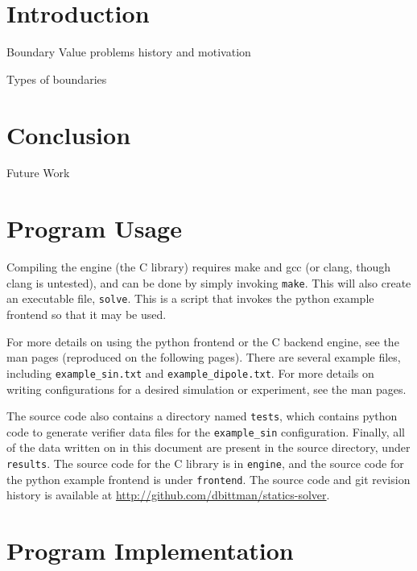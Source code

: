 \documentclass[12pt]{article}
\begin{document}
\section{Introduction}

Boundary Value problems history and motivation

Types of boundaries





\section{Conclusion}

Future Work



\clearpage
\begin{appendices}
\section{Program Usage}

Compiling the engine (the C library) requires make and gcc (or clang, though clang is untested), and can
be done by simply invoking \texttt{make}. This will also create an executable file, \texttt{solve}. This
is a script that invokes the python example frontend so that it may be used.

For more details on using the python frontend or the C backend engine, see the man pages (reproduced on the
following pages). There are several example files, including \texttt{example\_sin.txt} and \texttt{example\_dipole.txt}.
For more details on writing configurations for a desired simulation or experiment, see the man pages.

The source code also contains a directory named \texttt{tests}, which contains python code to generate verifier data
files for the \texttt{example\_sin} configuration. Finally, all of the data written on in this document are present
in the source directory, under \texttt{results}. The source code for the C library is in \texttt{engine}, and the
source code for the python example frontend is under \texttt{frontend}. The source code and git revision history
is available at \url{http://github.com/dbittman/statics-solver}.



\clearpage



\section{Program Implementation}
\label{app:des}

\end{appendices}
\end{document}
